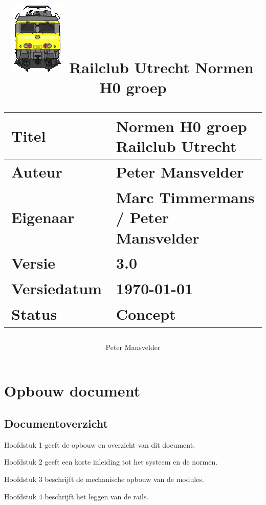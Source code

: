 \documentclass[12pt,a4paper]{report}
\newcommand*{\myfont}{\fontfamily{lmss}\normalsize\selectfont}
\begin{document}
\myfont

\title{
\includegraphics[scale=1.0]{images/rcu_logo}
\makebox[\linewidth]{\rule{\textwidth}{0.4pt}}
Railclub Utrecht
\vfill
Normen H0 groep\\
\makebox[\linewidth]{\rule{\textwidth}{0.4pt}}
\vfill
\small
\author{Peter Mansvelder}
\begin{tabular}{| l | l |}
\hline
\cellcolor[gray]{0.84}Titel & Normen H0 groep Railclub Utrecht\\
\hline
\cellcolor[gray]{0.84}Auteur & Peter Mansvelder\\
\hline
\cellcolor[gray]{0.84}Eigenaar & Marc Timmermans / Peter Mansvelder\\
\hline
\cellcolor[gray]{0.84}Versie & 3.0\\
\hline
\cellcolor[gray]{0.84}Versiedatum & \today\\
\hline
\cellcolor[gray]{0.84}Status & Concept\\
\hline
\end{tabular}
}

\maketitle

\tableofcontents

\listoffigures

\chapter{Opbouw document}

\section{Documentoverzicht}

Hoofdstuk 1 geeft de opbouw en overzicht van dit document.

Hoofdstuk 2 geeft een korte inleiding tot het systeem en de normen.

Hoofdstuk 3 beschrijft de mechanische opbouw van de modules.

Hoofdstuk 4 beschrijft het leggen van de rails.
\end{document}
